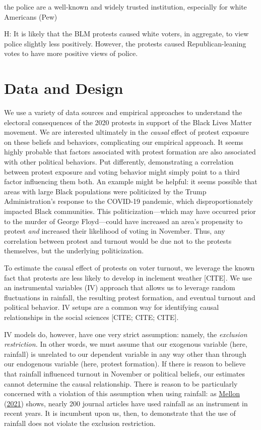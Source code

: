 \documentclass[
  12pt,
]{article}
\begin{document}
the police are a well-known and widely trusted institution, especially for white Americans (Pew)

H: It is likely that the BLM protests caused white voters, in aggregate, to view police slightly less positively. However, the protests caused Republican-leaning votes to have more positive views of police.

\hypertarget{data-and-design}{%
\section*{Data and Design}\label{data-and-design}}

We use a variety of data sources and empirical approaches to understand the electoral consequences of the 2020 protests in support of the Black Lives Matter movement. We are interested ultimately in the \emph{causal} effect of protest exposure on these beliefs and behaviors, complicating our empirical approach. It seems highly probable that factors associated with protest formation are also associated with other political behaviors. Put differently, demonstrating a correlation between protest exposure and voting behavior might simply point to a third factor influencing them both. An example might be helpful: it seems possible that areas with large Black populations were politicized by the Trump Administration's response to the COVID-19 pandemic, which disproportionately impacted Black communities. This politicization---which may have occurred prior to the murder of George Floyd---could have increased an area's propensity to protest \emph{and} increased their likelihood of voting in November. Thus, any correlation between protest and turnout would be due not to the protests themselves, but the underlying politicization.

To estimate the causal effect of protests on voter turnout, we leverage the known fact that protests are less likely to develop in inclement weather {[}CITE{]}. We use an instrumental variables (IV) approach that allows us to leverage random fluctuations in rainfall, the resulting protest formation, and eventual turnout and political behavior. IV setups are a common way for identifying causal relationships in the social sciences {[}CITE; CITE; CITE{]}.

IV models do, however, have one very strict assumption: namely, the \emph{exclusion restriction.} In other words, we must assume that our exogenous variable (here, rainfall) is unrelated to our dependent variable in any way other than through our endogenous variable (here, protest formation). If there is reason to believe that rainfall influenced turnout in November or political beliefs, our estimates cannot determine the causal relationship. There is reason to be particularly concerned with a violation of this assumption when using rainfall: as \protect\hyperlink{ref-Mellon2021}{Mellon} (\protect\hyperlink{ref-Mellon2021}{2021}) shows, nearly 200 journal articles have used rainfall as an instrument in recent years. It is incumbent upon us, then, to demonstrate that the use of rainfall does not violate the exclusion restriction.
\end{document}
